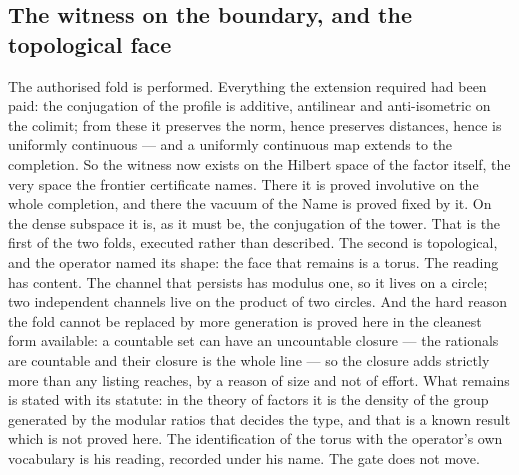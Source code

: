 \documentclass[11pt]{article}
\theoremstyle{definition}\newtheorem{deriv}{Derivation}
\begin{document}
\subsection*{The witness on the boundary, and the topological face}The authorised fold is performed. Everything the extension required had been paid: the conjugation of the profile is additive, antilinear and anti-isometric on the colimit; from these it preserves the norm, hence preserves distances, hence is uniformly continuous --- and a uniformly continuous map extends to the completion. So the witness now exists on the Hilbert space of the factor itself, the very space the frontier certificate names. There it is proved involutive on the whole completion, and there the vacuum of the Name is proved fixed by it. On the dense subspace it is, as it must be, the conjugation of the tower. That is the first of the two folds, executed rather than described. The second is topological, and the operator named its shape: the face that remains is a torus. The reading has content. The channel that persists has modulus one, so it lives on a circle; two independent channels live on the product of two circles. And the hard reason the fold cannot be replaced by more generation is proved here in the cleanest form available: a countable set can have an uncountable closure --- the rationals are countable and their closure is the whole line --- so the closure adds strictly more than any listing reaches, by a reason of size and not of effort. What remains is stated with its statute: in the theory of factors it is the density of the group generated by the modular ratios that decides the type, and that is a known result which is not proved here. The identification of the torus with the operator's own vocabulary is his reading, recorded under his name. The gate does not move.
\end{document}
